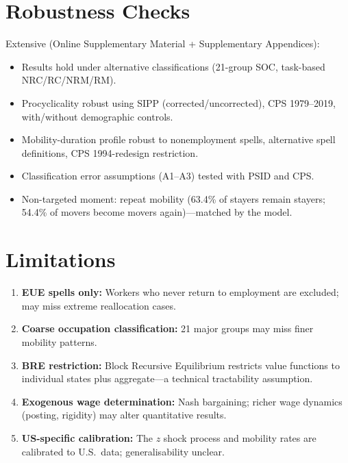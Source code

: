 \section{Robustness Checks}

Extensive (Online Supplementary Material + Supplementary Appendices):
\begin{itemize}
  \item Results hold under alternative classifications (21-group SOC,
    task-based NRC/RC/NRM/RM).
  \item Procyclicality robust using SIPP (corrected/uncorrected), CPS
    1979--2019, with/without demographic controls.
  \item Mobility-duration profile robust to nonemployment spells, alternative
    spell definitions, CPS 1994-redesign restriction.
  \item Classification error assumptions (A1--A3) tested with PSID and CPS.
  \item Non-targeted moment: repeat mobility (63.4\% of stayers remain stayers;
    54.4\% of movers become movers again)---matched by the model.
\end{itemize}

\section{Limitations}

\begin{enumerate}
  \item \textbf{EUE spells only:} Workers who never return to employment
    are excluded; may miss extreme reallocation cases.
  \item \textbf{Coarse occupation classification:} 21 major groups may miss
    finer mobility patterns.
  \item \textbf{BRE restriction:} Block Recursive Equilibrium restricts value
    functions to individual states plus aggregate---a technical tractability
    assumption.
  \item \textbf{Exogenous wage determination:} Nash bargaining; richer wage
    dynamics (posting, rigidity) may alter quantitative results.
  \item \textbf{US-specific calibration:} The $z$ shock process and mobility
    rates are calibrated to U.S.\ data; generalisability unclear.
\end{enumerate}

